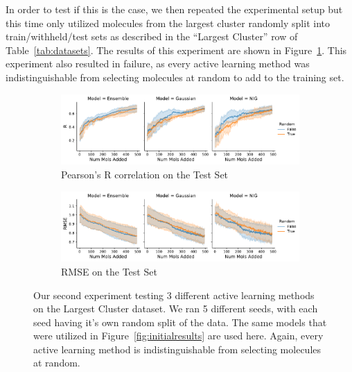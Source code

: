 \documentclass[journal=jmcmar,manuscript=article]{achemso}
\begin{document}
In order to test if this is the case, we then repeated the experimental setup but this time only utilized molecules from the largest cluster randomly split into train/withheld/test sets as described in the ``Largest Cluster'' row of Table~\ref{tab:datasets}. The results of this experiment are shown in Figure~\ref{fig:lcresults}. This experiment also resulted in failure, as every active learning method was indistinguishable from selecting molecules at random to add to the training set.

\begin{figure}[tbph]
    \centering
    \begin{subfigure}[b]{0.48\textwidth}
        \includegraphics[width=1\linewidth]{figures/fig3_largest_cluster_R.pdf}
        \caption{Pearson's R correlation on the Test Set}
    \end{subfigure}%
    \hfill
    \begin{subfigure}[b]{0.48\textwidth}
        \includegraphics[width=1\linewidth]{figures/fig3_largest_cluster_RMSE.pdf}
        \caption{RMSE on the Test Set}
    \end{subfigure}
    \caption{Our second experiment testing 3 different active learning methods on the Largest Cluster dataset. We ran 5 different seeds, with each seed having it's own random split of the data. The same models that were utilized in Figure~\ref{fig:initialresults} are used here. Again, every active learning method is indistinguishable from selecting molecules at random.}
    \label{fig:lcresults}
\end{figure}
\end{document}
